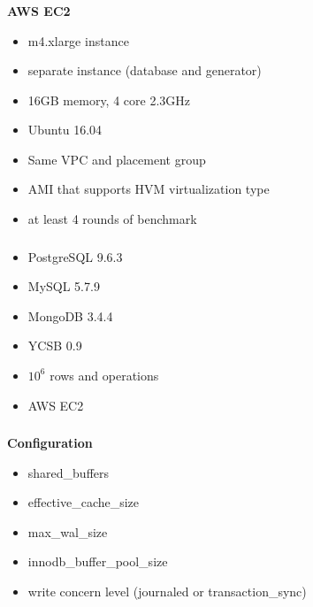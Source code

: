 \documentclass[usenames,dvipsnames, 18pt, compress, aspectratio=169]{beamer}
\begin{document}
\begin{frame}
    \frametitle{}
    \begin{center}
        \textbf{AWS EC2}
        \begin{itemize}[label={}]
            \item m4.xlarge instance
            \item separate instance (database and generator)
            \item 16GB memory, 4 core 2.3GHz
            \item Ubuntu 16.04
            \item Same VPC and placement group
            \item AMI that supports HVM virtualization type
            \item at least 4 rounds of benchmark
        \end{itemize}
    \end{center}
\end{frame}

\begin{frame}
    \frametitle{}
    \begin{center}
        \begin{itemize}[label={}]
            \item PostgreSQL 9.6.3
            \item MySQL 5.7.9
            \item MongoDB 3.4.4
            \item YCSB 0.9
            \item $10^6$ rows and operations
            \item AWS EC2
        \end{itemize}
    \end{center}
\end{frame}

\begin{frame}
    \frametitle{}
    \begin{center}
        \textbf{Configuration}
        \begin{itemize}[label={}]
            \item shared\_buffers
            \item effective\_cache\_size
            \item max\_wal\_size
            \item innodb\_buffer\_pool\_size
            \item write concern level (journaled or transaction\_sync)
        \end{itemize}
    \end{center}
\end{frame}
\end{document}
